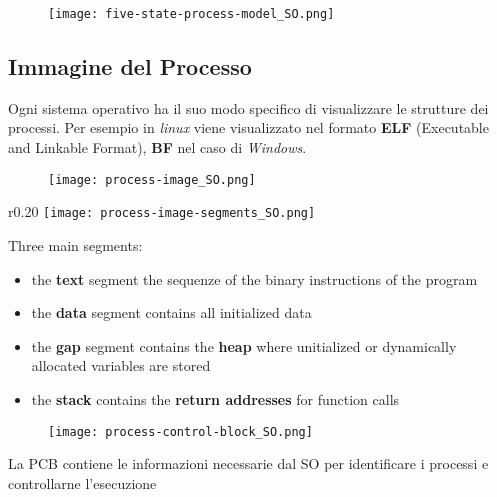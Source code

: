 \documentclass[12pt, a4paper]{article}
\begin{document}
	\begin{figure}[!htbp]
		\centering
		\texttt{[image: five-state-process-model\_SO.png]}
		\caption*{}
		\label{fig:five-state-model}
	\end{figure}

	\newpage
	
	
	\subsection*{Immagine del Processo} 
	Ogni sistema operativo ha il suo modo specifico di visualizzare le strutture dei processi. Per esempio in \textit{linux} viene visualizzato nel formato \textbf{ELF} (Executable and Linkable Format), \textbf{BF} nel caso di \textit{Windows}.
	
	
	\begin{figure}[!htbp]
		\centering
		\texttt{[image: process-image\_SO.png]}
		\caption*{}
		\label{fig:process-image}
	\end{figure}
	
	\begin{wrapfigure}{r}{0.20\textwidth}
		\centering
		\texttt{[image: process-image-segments\_SO.png]}
		\caption*{}
		\label{fig:process-image-segments}
	\end{wrapfigure}
	
	Three main segments:
	\begin{itemize}
		\item the \textbf{text} segment the sequenze of the binary instructions of the program
		
		\item the \textbf{data} segment contains all initialized data
		
		\item the \textbf{gap} segment contains the \textbf{heap} where unitialized or dynamically allocated variables are stored
		
		\item the \textbf{stack} contains the \textbf{return addresses} for function calls
	\end{itemize}

	\begin{figure}[!htbp]
		\centering
		\texttt{[image: process-control-block\_SO.png]}
		\label{fig:process-control-block}
	\end{figure}

	La PCB contiene le informazioni necessarie dal SO per identificare i processi e controllarne l'esecuzione \\\\
	
\end{document}
